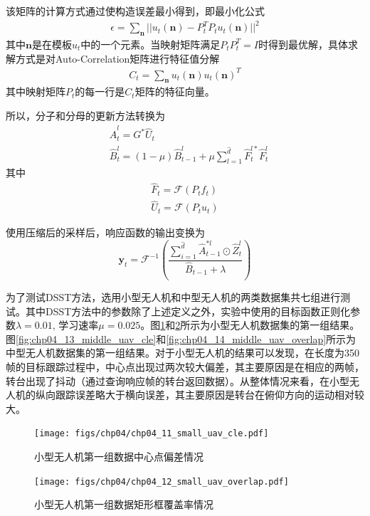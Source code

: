 该矩阵的计算方式通过使构造误差最小得到，即最小化公式
\begin{align}
\epsilon=\sum_\mathbf{n}||u_t(\mathbf{n})-P_t^TP_tu_t(\mathbf{n})||^2
\end{align}
其中$\mathbf{n}$是在模板$u_t$中的一个元素。当映射矩阵满足$P_tP_t^T=I$时得到最优解，具体求解方式是对Auto-Correlation矩阵进行特征值分解
\begin{align}
C_t=\sum_{\mathbf{n}}u_t(\mathbf{n})u_t(\mathbf{n})^T
\end{align}
其中映射矩阵$P_t$的每一行是$C_t$矩阵的特征向量。

所以，分子和分母的更新方法转换为
\begin{align}
&\hat{A}_t^l=G^*\hat{U}_t\\
&\hat{B}_t^l=(1-\mu) \hat{B}_{t-1}^{l}+\mu \sum_{l=1}^{\hat{d}}\hat{F}_t^{l*}\hat{F}^l_t
\end{align}
其中
\begin{align}
\hat{F}_t=\mathcal{F}(P_tf_t)\\
\hat{U}_t=\mathcal{F}(P_tu_t)
\end{align}

使用压缩后的采样后，响应函数的输出变换为
\begin{equation}
\mathbf{y}_t={\mathcal{F}^{-1}}(\frac{\sum_{i=1}^{\hat{d}}{\hat{A}^{*l}_{t-1}} \odot \hat{Z}^{l}_{t}}{\hat{B}_{t-1}+\lambda})
\end{equation}

为了测试DSST方法，选用小型无人机和中型无人机的两类数据集共七组进行测试。其中DSST方法中的参数除了上述定义之外，实验中使用的目标函数正则化参数$\lambda=0.01$, 学习速率$\mu=0.025$。图\ref{fig:chp04_11_small_uav_cle}和\ref{fig:chp04_12_small_uav_overlap}所示为小型无人机数据集的第一组结果。图\ref{fig:chp04_13_middle_uav_cle}和\ref{fig:chp04_14_middle_uav_overlap}所示为中型无人机数据集的第一组结果。对于小型无人机的结果可以发现，在长度为350帧的目标跟踪过程中，中心点出现过两次较大偏差，其主要原因是在相应的两帧，转台出现了抖动（通过查询响应帧的转台返回数据）。从整体情况来看，在小型无人机的纵向跟踪误差略大于横向误差，其主要原因是转台在俯仰方向的运动相对较大。
\begin{figure}[ht]   
	\centering
	\texttt{[image: figs/chp04/chp04\_11\_small\_uav\_cle.pdf]}
	\caption{小型无人机第一组数据中心点偏差情况}
	\label{fig:chp04_11_small_uav_cle}
\end{figure}

\begin{figure}[ht]   
	\centering
	\texttt{[image: figs/chp04/chp04\_12\_small\_uav\_overlap.pdf]}
	\caption{小型无人机第一组数据矩形框覆盖率情况}
	\label{fig:chp04_12_small_uav_overlap}
\end{figure}

